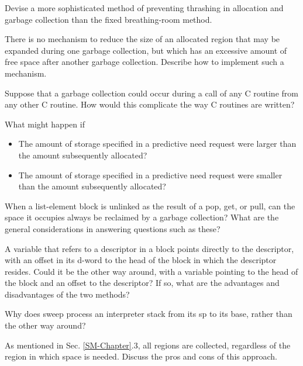  Devise a more sophisticated method of preventing
thrashing in allocation and garbage collection than the fixed
breathing-room method.

There is no mechanism to reduce the size of an
allocated region that may be expanded during one garbage collection,
but which has an excessive amount of free space after another garbage
collection. Describe how to implement such a mechanism.

Suppose that a garbage collection could occur
during a call of any C routine from any other C routine. How would
this complicate the way C routines are written?

What might happen if

\begin{itemize}

\item The amount of storage specified in a predictive need request
were larger than the amount subsequently allocated?

\item The amount of storage specified in a predictive need request
were smaller than the amount subsequently allocated?

\end{itemize}

When a list-element block is unlinked as the
result of a pop, get, or pull, can the space it occupies always be
reclaimed by a garbage collection? What are the general considerations
in answering questions such as these?

A variable that refers to a descriptor in a
block points directly to the descriptor, with an offset in its d-word
to the head of the block in which the descriptor resides. Could it be
the other way around, with a variable pointing to the head of the
block and an offset to the descriptor? If so, what are the advantages
and disadvantages of the two methods?

Why does sweep process an interpreter stack from
its sp to its base, rather than the other way around?

As mentioned in Sec. \ref*{SM-Chapter}.3, all regions are
collected, regardless of the region in which space is needed. Discuss
the pros and cons of this approach.

